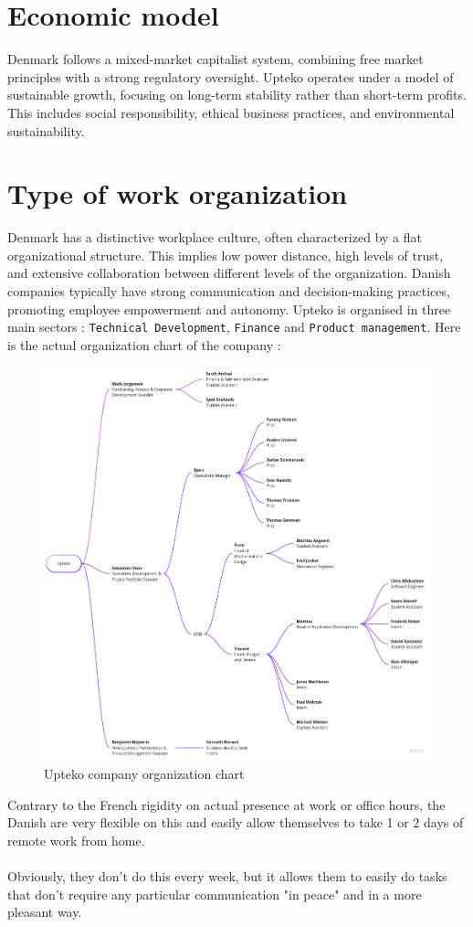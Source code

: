 \section{Economic model}
Denmark follows a mixed-market capitalist system, combining free market principles with a strong regulatory oversight. Upteko operates under a model of sustainable growth, focusing on long-term stability rather than short-term profits. This includes social responsibility, ethical business practices, and environmental sustainability.

\section{Type of work organization}
Denmark has a distinctive workplace culture, often characterized by a flat organizational structure. This implies low power distance, high levels of trust, and extensive collaboration between different levels of the organization. Danish companies typically have strong communication and decision-making practices, promoting employee empowerment and autonomy.
Upteko is organised in three main sectors : \texttt{Technical Development}, \texttt{Finance} and \texttt{Product management}. Here is the actual organization chart of the company :
\begin{figure}[H]
    \centering
    \includegraphics[width=1.0\linewidth]{./company_presentation/upteko_organization.jpg}
    \caption{Upteko company organization chart}
\end{figure}

Contrary to the French rigidity on actual presence at work or office hours, the Danish are very flexible on this and easily allow themselves to take 1 or 2 days of remote work from home.
\\ \\
Obviously, they don't do this every week, but it allows them to easily do tasks that don't require any particular communication "in peace" and in a more pleasant way.